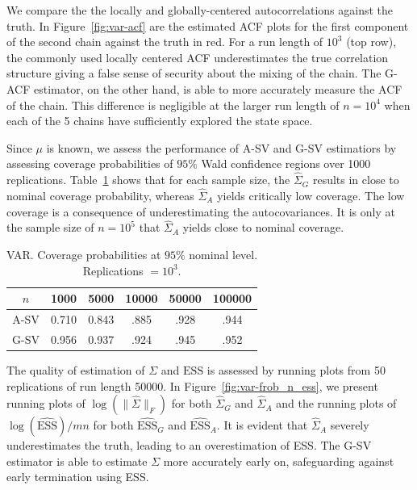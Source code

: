 \documentclass[11pt]{article}
\theoremstyle{remark}
\begin{document}
We compare the the locally and globally-centered autocorrelations against the truth. In Figure~\ref{fig:var-acf} are the estimated ACF plots for the first component of the second chain against the truth in red. For a run length of $10^3$ (top row), the commonly used locally centered ACF underestimates the true correlation structure giving a false sense of security about the mixing of the chain. The G-ACF estimator, on the other hand, is able to more accurately measure the ACF of the chain. This difference is negligible at the larger run length of $n = 10^4$ when each of the 5 chains have sufficiently explored the state space.


Since $\mu$ is known, we assess the performance of A-SV and G-SV estimatiors by assessing coverage probabilities of $95\%$ Wald confidence regions over 1000 replications.  Table~\ref{tab:var-coverage} shows that for each sample size, the $\hat{\Sigma}_G$ results in close to nominal coverage probability, whereas $\hat{\Sigma}_A$ yields critically low coverage. The low coverage is a consequence of underestimating the autocovariances. It is only at the sample size of $n=10^5$ that $\hat{\Sigma}_A$ yields close to nominal coverage. 


\begin{table}[htbp]
    \centering
    \small
    \begin{tabular}{|c|ccccc|}
    \hline
$n$  &  1000  & 5000  & 10000  & 50000  & 100000 \\  \hline
A-SV  &    0.710 & 0.843 & .885 & .928 & .944 \\ 
G-SV  &    0.956 & 0.937 & .924 & .945 & .952 \\ \hline
    \end{tabular}
    \caption{VAR. Coverage probabilities at $95 \%$ nominal level. Replications $= 10^3$.}
    \label{tab:var-coverage}
\end{table}



The quality of estimation of $\Sigma$ and $\text{ESS}$ is assessed by running plots from 50 replications of run length 50000. 
 In Figure~\ref{fig:var-frob_n_ess}, we present running plots of $\log(\|\hat{\Sigma}\|_F)$ for both $\hat{\Sigma}_G$ and $\hat{\Sigma}_A$ and the running plots of $\log(\widehat{\text{ESS}})/mn$ for both  $\widehat{\text{ESS}}_G$ and $\widehat{\text{ESS}}_A$. It is evident that $\hat{\Sigma}_A$ severely underestimates the truth, leading to an overestimation of ESS. The G-SV estimator is able to estimate $\Sigma$ more accurately early on, safeguarding against early termination using ESS. 
\end{document}
